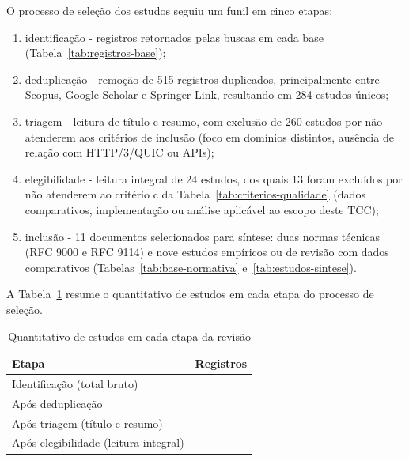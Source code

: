 O processo de seleção dos estudos seguiu um funil em cinco etapas:

\begin{enumerate}[label=\alph*)]
\item identificação - registros retornados pelas buscas em cada base (Tabela~\ref{tab:registros-base});
\item deduplicação - remoção de 515 registros duplicados, principalmente entre Scopus, Google Scholar e Springer Link, resultando em 284 estudos únicos;
\item triagem - leitura de título e resumo, com exclusão de 260 estudos por não atenderem aos critérios de inclusão (foco em domínios distintos, ausência de relação com HTTP/3/QUIC ou APIs);
\item elegibilidade - leitura integral de 24 estudos, dos quais 13 foram excluídos por não atenderem ao critério c da Tabela~\ref{tab:criterios-qualidade} (dados comparativos, implementação ou análise aplicável ao escopo deste TCC);
\item inclusão - 11 documentos selecionados para síntese: duas normas técnicas (RFC 9000 e RFC 9114) e nove estudos empíricos ou de revisão com dados comparativos (Tabelas~\ref{tab:base-normativa} e~\ref{tab:estudos-sintese}).
\end{enumerate}

A Tabela~\ref{tab:funil-revisao} resume o quantitativo de estudos em cada etapa do processo de seleção.


\begin{table}[htbp]
\centering
\caption{Quantitativo de estudos em cada etapa da revisão}\label{tab:funil-revisao}
\small
\setlength{\tabcolsep}{3pt}
\begin{tabular}{@{}>{\raggedright\arraybackslash}p{100mm}>{\raggedright\arraybackslash}p{28mm}@{}} \hline
\textbf{Etapa} & \textbf{Registros} \\
\hline
Identificação (total bruto) & 799 \\
Após deduplicação & 284 \\
Após triagem (título e resumo) & 24 \\
Após elegibilidade (leitura integral) & 11 \\
\hline
\end{tabular}
\end{table}

